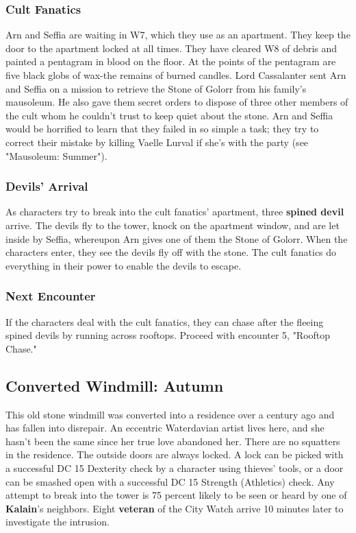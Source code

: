\documentclass[10pt,a4paper,twoside,twocolumn,openany,nodeprecatedcode]{dndbook}
\begin{document}
\subsubsection{Cult Fanatics}
Arn and Seffia are waiting in W7, which they use as an apartment. They keep the door to the apartment locked at all times. They have cleared W8 of debris and painted a pentagram in blood on the floor. At the points of the pentagram are five black globs of wax-the remains of burned candles.
Lord Cassalanter sent Arn and Seffia on a mission to retrieve the Stone of Golorr from his family's mausoleum. He also gave them secret orders to dispose of three other members of the cult whom he couldn't trust to keep quiet about the stone. Arn and Seffia would be horrified to learn that they failed in so simple a task; they try to correct their mistake by killing Vaelle Lurval if she's with the party (see "Mausoleum: Summer").
\subsubsection{Devils' Arrival}
As characters try to break into the cult fanatics' apartment, three \textbf{spined devil} arrive. The devils fly to the tower, knock on the apartment window, and are let inside by Seffia, whereupon Arn gives one of them the Stone of Golorr. When the characters enter, they see the devils fly off with the stone. The cult fanatics do everything in their power to enable the devils to escape.
\subsubsection{Next Encounter}
If the characters deal with the cult fanatics, they can chase after the fleeing spined devils by running across rooftops. Proceed with encounter 5, "Rooftop Chase."
\subsection{Converted Windmill: Autumn}
This old stone windmill was converted into a residence over a century ago and has fallen into disrepair. An eccentric Waterdavian artist lives here, and she hasn't been the same since her true love abandoned her. There are no squatters in the residence.
The outside doors are always locked. A lock can be picked with a successful DC 15 Dexterity check by a character using thieves' tools, or a door can be smashed open with a successful DC 15 Strength (Athletics) check. Any attempt to break into the tower is 75 percent likely to be seen or heard by one of \textbf{Kalain}'s neighbors. Eight \textbf{veteran} of the City Watch arrive 10 minutes later to investigate the intrusion.
\end{document}
